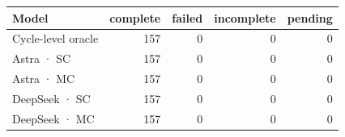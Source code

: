 \begin{tabular}{lrrrr}
\toprule
Model & complete & failed & incomplete & pending \\
\midrule
Cycle-level oracle & 157 & 0 & 0 & 0 \\
Astra · SC & 157 & 0 & 0 & 0 \\
Astra · MC & 157 & 0 & 0 & 0 \\
DeepSeek · SC & 157 & 0 & 0 & 0 \\
DeepSeek · MC & 157 & 0 & 0 & 0 \\
\bottomrule
\end{tabular}
